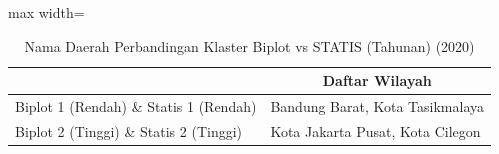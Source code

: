 \begin{table}[H]
\centering
\caption{Nama Daerah Perbandingan Klaster Biplot vs STATIS (Tahunan) (2020)} \label{tab:sample2biplot_statis_comp_name_2020}
\begin{adjustbox}{max width=\textwidth}
\begin{tabular}{|>{\centering\arraybackslash}p{4cm}|p{10cm}|}
\hline
\multicolumn{1}{|c|}{\textbf{Kategori}} & \multicolumn{1}{c|}{\textbf{Daftar Wilayah}} \\
\hline
Biplot 1 (Rendah) \& Statis 1 (Rendah) & Bandung Barat, Kota Tasikmalaya \\
\hline
Biplot 2 (Tinggi) \& Statis 2 (Tinggi) & Kota Jakarta Pusat, Kota Cilegon \\
\hline
\end{tabular}
\end{adjustbox}
\end{table}